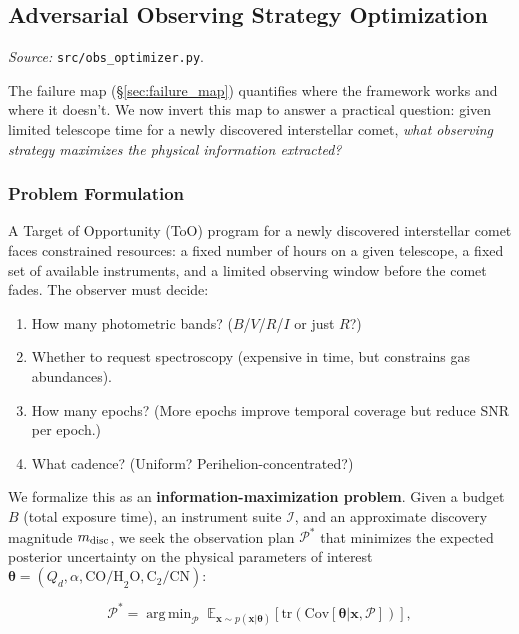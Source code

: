 \documentclass[usenatbib]{mnras}
\DeclareMathOperator*{\argmin}{arg\,min}
\begin{document}
\subsection{Adversarial Observing Strategy Optimization}\label{sec:obsopt}

\textit{Source:} \texttt{src/obs\_optimizer.py}.

The failure map (\S\ref{sec:failure_map}) quantifies where the framework works and where it doesn't. We now invert this map to answer a practical question: given limited telescope time for a newly discovered interstellar comet, \textit{what observing strategy maximizes the physical information extracted?}

\subsubsection{Problem Formulation}

A Target of Opportunity (ToO) program for a newly discovered interstellar comet faces constrained resources: a fixed number of hours on a given telescope, a fixed set of available instruments, and a limited observing window before the comet fades. The observer must decide:
\begin{enumerate}
    \item How many photometric bands? ($B$/$V$/$R$/$I$ or just $R$?)
    \item Whether to request spectroscopy (expensive in time, but constrains gas abundances).
    \item How many epochs? (More epochs improve temporal coverage but reduce SNR per epoch.)
    \item What cadence? (Uniform? Perihelion-concentrated?)
\end{enumerate}

We formalize this as an \textbf{information-maximization problem}. Given a budget $B$ (total exposure time), an instrument suite $\mathcal{I}$, and an approximate discovery magnitude $m_{\rm disc}$, we seek the observation plan $\mathcal{P}^*$ that minimizes the expected posterior uncertainty on the physical parameters of interest $\boldsymbol{\theta} = (Q_d, \alpha, \text{CO/H}_2\text{O}, \text{C}_2/\text{CN})$:

\begin{equation}\label{eq:obsopt}
\mathcal{P}^* = \argmin_{\mathcal{P}} \; \mathbb{E}_{\mathbf{x} \sim p(\mathbf{x}|\boldsymbol{\theta})}\left[\text{tr}\left(\text{Cov}[\boldsymbol{\theta} | \mathbf{x}, \mathcal{P}]\right)\right],
\end{equation}
\end{document}
